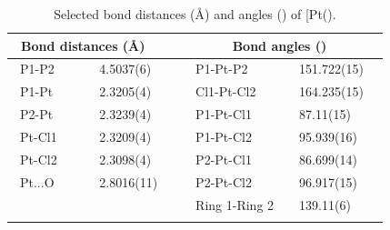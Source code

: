 \begin{table}[ht]
\caption[Bond distances (\AA) and angles (\degrees) of [Pt(\tButhixantphos)\ce{Cl2]}]{Selected bond distances (\AA) and angles (\degrees) of [Pt(\tButhixantphos)\ce{Cl2]}.}
\label{table:crystalthixantphosplatinumdichloride:lengths}
\small
\begin{center}
\begin{tabular}{l l l l}
	\toprule
	\multicolumn{2}{l}{\bfseries{~Bond distances (\si{\angstrom})}} & \multicolumn{2}{c}{\bfseries{Bond angles (\degrees)}} \\
	\midrule		
	~P1-P2		~~&~~4.5037(6)~~	&~~P1-Pt-P2			&~~151.722(15)~~	\\	
	~P1-Pt		~~&~~2.3205(4)~~	&~~Cl1-Pt-Cl2			&~~164.235(15)~~	\\
	~P2-Pt		~~&~~2.3239(4)~~	&~~P1-Pt-Cl1			&~~87.11(15)~~	\\
	~Pt-Cl1		~~&~~2.3209(4)~~	&~~P1-Pt-Cl2			&~~95.939(16)~~	\\
	~Pt-Cl2		~~&~~2.3098(4)~~	&~~P2-Pt-Cl1			&~~86.699(14)~~	\\
	~Pt...O		~~&~~2.8016(11)~~	&~~P2-Pt-Cl2			&~~96.917(15)~~	\\
	~				&			&~~Ring 1-Ring 2		&~~139.11(6)~~	\\
	\bottomrule{}
\end{tabular}
\end{center}
\end{table}

